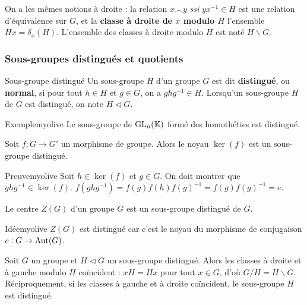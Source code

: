    On a les mêmes notions à droite : la relation $x \frown y$ \textit{ssi} $yx^{-1} \in H$ est une relation d’équivalence sur $G$, et la \textbf{classe à droite de $x$ modulo $H$} l’ensemble $Hx = \delta_x(H)$. L’ensemble des classes à droite modulo $H$ est noté $H \backslash G$.

    \subsubsection{Sous-groupes distingués et quotients}

    \begin{defi}{Sous-groupe distingué}{}
        Un sous-groupe $H$ d’un groupe $G$ est dit \textbf{distingué}, ou \textbf{normal}, si pour tout $h \in H$ et $g \in G$, on a $g h g^{-1} \in H$. Lorsqu’un sous-groupe $H$ de $G$ est distingué, on note $H \lhd G$.
    \end{defi}

    \begin{omed}{Exemple}{myolive}
        Le sous-groupe de $\operatorname{GL}_n(\mathbb{K})$ formé des homothéties est distingué.
    \end{omed}

    \begin{prop}{}{}
        Soit $f : G \to G'$ un morphisme de groupe. Alors le noyau $\ker(f)$ est un sous-groupe distingué.
    \end{prop}

    \begin{demo}{Preuve}{myolive}
        Soit $h \in \ker(f)$ et $g \in G$. On doit montrer que $g h g^{-1} \in \ker(f)$. $f(ghg^{-1}) = f(g)f(h)f(g)^{-1} = f(g)f(g)^{-1} = e$.
    \end{demo}

    \begin{prop}{}{}
        Le centre $Z(G)$ d’un groupe $G$ est un sous-groupe distingué de $G$.
    \end{prop}

    \begin{demo}{Idée}{myolive}
        $Z(G)$ est distingué car c’est le noyau du morphisme de conjugaison $c : G \to \operatorname{Aut}(G)$.
    \end{demo}

    \begin{lem}{}{}
        Soit $G$ un groupe et $H \lhd G$ un sous-groupe distingué. Alors les classes à droite et à gauche modulo $H$ coïncident : $x H = H x$ pour tout $x \in G$, d’où $G / H = H \backslash G$. Réciproquement, si les classes à gauche et à droite coïncident, le sous-groupe $H$ est distingué.
    \end{lem}

